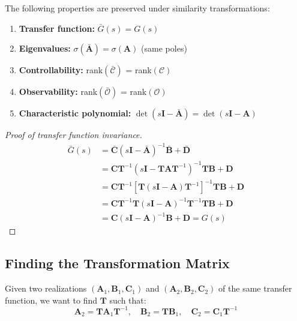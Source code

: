 \begin{theorem}
The following properties are preserved under similarity transformations:
\begin{enumerate}
    \item \textbf{Transfer function:} $\bar{G}(s) = G(s)$
    \item \textbf{Eigenvalues:} $\sigma(\bar{\mathbf{A}}) = \sigma(\mathbf{A})$ (same poles)
    \item \textbf{Controllability:} rank$(\bar{\mathcal{C}})$ = rank$(\mathcal{C})$
    \item \textbf{Observability:} rank$(\bar{\mathcal{O}})$ = rank$(\mathcal{O})$
    \item \textbf{Characteristic polynomial:} $\det(s\mathbf{I} - \bar{\mathbf{A}}) = \det(s\mathbf{I} - \mathbf{A})$
\end{enumerate}
\end{theorem}

\begin{proof}[Proof of transfer function invariance]
\begin{align}
\bar{G}(s) &= \bar{\mathbf{C}}(s\mathbf{I} - \bar{\mathbf{A}})^{-1}\bar{\mathbf{B}} + \bar{\mathbf{D}} \\
&= \mathbf{C}\mathbf{T}^{-1}(s\mathbf{I} - \mathbf{T}\mathbf{A}\mathbf{T}^{-1})^{-1}\mathbf{T}\mathbf{B} + \mathbf{D} \\
&= \mathbf{C}\mathbf{T}^{-1}[\mathbf{T}(s\mathbf{I} - \mathbf{A})\mathbf{T}^{-1}]^{-1}\mathbf{T}\mathbf{B} + \mathbf{D} \\
&= \mathbf{C}\mathbf{T}^{-1}\mathbf{T}(s\mathbf{I} - \mathbf{A})^{-1}\mathbf{T}^{-1}\mathbf{T}\mathbf{B} + \mathbf{D} \\
&= \mathbf{C}(s\mathbf{I} - \mathbf{A})^{-1}\mathbf{B} + \mathbf{D} = G(s)
\end{align}
\end{proof}

\subsection{Finding the Transformation Matrix}

Given two realizations $(\mathbf{A}_1, \mathbf{B}_1, \mathbf{C}_1)$ and $(\mathbf{A}_2, \mathbf{B}_2, \mathbf{C}_2)$ of the same transfer function, we want to find $\mathbf{T}$ such that:
\begin{equation}
\mathbf{A}_2 = \mathbf{T}\mathbf{A}_1\mathbf{T}^{-1}, \quad \mathbf{B}_2 = \mathbf{T}\mathbf{B}_1, \quad \mathbf{C}_2 = \mathbf{C}_1\mathbf{T}^{-1}
\end{equation}

